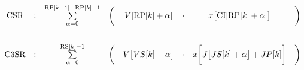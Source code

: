 $$
\begin{matrix}
  \text{CSR}  & : & \sum \limits_{\alpha = 0}^{\RP[k+1] - \RP[k] - 1} & \bigg( & V[\RP[k] + \alpha]   & \cdot & x\big[\CI[\RP[k] + \alpha]\big] & \bigg)\\
  \vspace{0.3cm} \\
  \text{C3SR} & : & \sum \limits_{\alpha = 0}^{\RS[k] - 1} & \bigg( & V\big[VS[k] + \alpha\big] & \cdot & x\bigg[J\big[JS[k] + \alpha\big] + JP[k]\bigg] & \bigg) \\
\end{matrix}
$$
